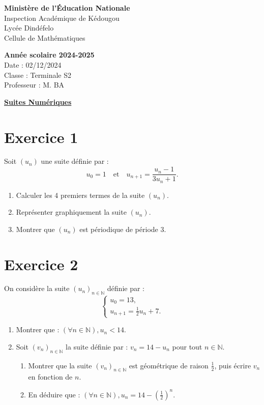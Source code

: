 \documentclass[12pt]{article}
\begin{document}
\noindent
\begin{minipage}[t]{0.48\textwidth}
\raggedright
\textbf{Ministère de l'Éducation Nationale}\\
Inspection Académique de Kédougou\\
Lycée Dindéfelo\\
Cellule de Mathématiques
\end{minipage}
\hfill
\begin{minipage}[t]{0.48\textwidth}
\raggedleft
\textbf{Année scolaire 2024-2025}\\
Date : 02/12/2024\\
Classe : Terminale S2\\
Professeur : M. BA
\end{minipage}
\begin{center}
\underline{\textbf{Suites Numériques}}
\end{center}
\section*{Exercice 1}

Soit \((u_n)\) une suite définie par :
\[
u_0 = 1 \quad \text{et} \quad u_{n+1} = \frac{u_n - 1}{3u_n + 1}.
\]

\begin{enumerate}
    \item Calculer les 4 premiers termes de la suite \((u_n)\).
    \item Représenter graphiquement la suite \((u_n)\).
    \item Montrer que \((u_n)\) est périodique de période 3.
\end{enumerate}

\section*{Exercice 2}

On considère la suite \((u_n)_{n \in \mathbb{N}}\) définie par :
\[
\begin{cases}
u_0 = 13, \\
u_{n+1} = \frac{1}{2} u_n + 7.
\end{cases}
\]

\begin{enumerate}
    \item Montrer que : \((\forall n \in \mathbb{N}), u_n < 14\).
    \item Soit \((v_n)_{n \in \mathbb{N}}\) la suite définie par : \(v_n = 14 - u_n\) pour tout \(n \in \mathbb{N}\).
    \begin{enumerate}
        \item Montrer que la suite \((v_n)_{n \in \mathbb{N}}\) est géométrique de raison \(\frac{1}{2}\), puis écrire \(v_n\) en fonction de \(n\).
        \item En déduire que : \((\forall n \in \mathbb{N}), u_n = 14 - \left( \frac{1}{2} \right)^n\).
    \end{enumerate}
\end{enumerate}
\end{document}
